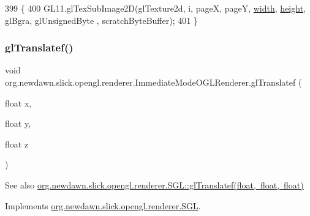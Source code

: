 \begin{DoxyCode}
399                                           \{
400         GL11.glTexSubImage2D(glTexture2d, i, pageX, pageY, \mbox{\hyperlink{classorg_1_1newdawn_1_1slick_1_1opengl_1_1renderer_1_1_immediate_mode_o_g_l_renderer_a65d0a04d747368ea954f69074d9102d6}{width}}, \mbox{\hyperlink{classorg_1_1newdawn_1_1slick_1_1opengl_1_1renderer_1_1_immediate_mode_o_g_l_renderer_aec68994a0ee3b7b478122af823c8a8d7}{height}}, glBgra, glUnsignedByte
      , scratchByteBuffer);
401     \}
\end{DoxyCode}
\mbox{\label{classorg_1_1newdawn_1_1slick_1_1opengl_1_1renderer_1_1_immediate_mode_o_g_l_renderer_af435628534b92fba8004ef8b4b6b388a}} 
\subsubsection{\texorpdfstring{gl\+Translatef()}{glTranslatef()}}
{\footnotesize\ttfamily void org.\+newdawn.\+slick.\+opengl.\+renderer.\+Immediate\+Mode\+O\+G\+L\+Renderer.\+gl\+Translatef (\begin{DoxyParamCaption}\item[{float}]{x,  }\item[{float}]{y,  }\item[{float}]{z }\end{DoxyParamCaption})\hspace{0.3cm}{\ttfamily [inline]}}

\begin{DoxySeeAlso}{See also}
\mbox{\hyperlink{interfaceorg_1_1newdawn_1_1slick_1_1opengl_1_1renderer_1_1_s_g_l_a647aff6cabd0c83869166144e9aee833}{org.\+newdawn.\+slick.\+opengl.\+renderer.\+S\+G\+L\+::gl\+Translatef(float, float, float)}} 
\end{DoxySeeAlso}


Implements \mbox{\hyperlink{interfaceorg_1_1newdawn_1_1slick_1_1opengl_1_1renderer_1_1_s_g_l_a647aff6cabd0c83869166144e9aee833}{org.\+newdawn.\+slick.\+opengl.\+renderer.\+S\+GL}}.



